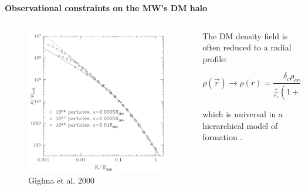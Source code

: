 \documentclass[xcolor=dvipsnames]{beamer}
\begin{document}
\begin{frame}
\centering
\LARGE
\textbf{Observational constraints on the MW's DM halo}
\normalsize
\end{frame}

\begin{frame}
\small

\begin{columns}[c]

\begin{column}{.5\textwidth}
\begin{figure}
\includegraphics[width=0.8\linewidth]{./pics/radialProfile.png}
\caption{\tiny Gighna et al. 2000}
\end{figure}
\end{column}

\begin{column}{.6\textwidth}

The DM density field is often reduced to a radial profile:

\begin{equation}
\rho(\vec{r}) \rightarrow \rho(r) = \frac{\delta_c \rho_{crit}}{\frac{r}{r_c}\left( 1 + \frac{r}{r_c}\right)},
\end{equation}

which is universal in a hierarchical model of formation \cite{Navarro1997}.\\~\\

\end{column}

\end{columns}

\end{frame}
\end{document}

